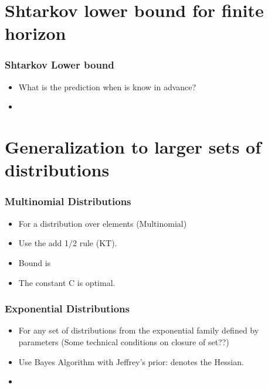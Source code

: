 \documentclass[handout]{beamer}
\begin{document}

\section{Shtarkov lower bound for finite horizon}

\begin{frame}
\frametitle{Shtarkov Lower bound}
\begin{itemize}
\item What is the  prediction when  is know in
  advance?
\item
{}
\end{itemize}
\end{frame}

\section{Generalization to larger sets of distributions}

\begin{frame}
\frametitle{Multinomial Distributions}
\begin{itemize}
\item For a distribution over  elements (Multinomial) 
\item Use the add 1/2 rule (KT).
\R{\[
p(i) = \frac{n_i+1/2}{t+k/2}
\]}
\item Bound is
\item 
The constant C is optimal.
\end{itemize}
\end{frame}

\begin{frame}
\frametitle{Exponential Distributions}
\begin{itemize}
\item For any set of distributions from the exponential family
  defined by  parameters (Some technical conditions on closure
  of set??) \B{[Rissanen??]}
\item Use Bayes Algorithm with Jeffrey's prior:
\R{\[
\dweight{\btheta}{*} = \frac{1}{Z} 
\frac{1}{\sqrt{
\left| \left. {\mathbf H} \paren{D_{KL} (\btheta || \theta) } \right|_{\theta=\btheta} \right|
}}
\]}
 denotes the Hessian.
\item
{}
\end{itemize}
\end{frame}
\end{document}
